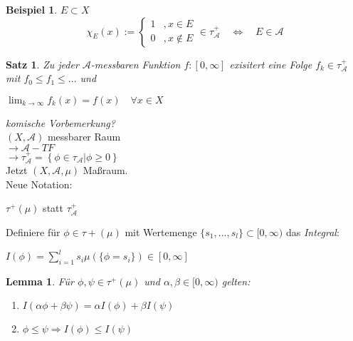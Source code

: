 \documentclass[11pt]{memoir}
\theoremstyle{changebreak}
\newtheorem{Beispiel}{Beispiel}[chapter]
\newtheorem{Lemma}{Lemma}[chapter]
\newtheorem{Satz}{Satz}[chapter]
\begin{document}
\begin{Beispiel}
$E \subset X$ \\
\begin{equation}
	\chi_E (x) :=
	\begin{cases}
		1 &, x \in E \\
		0 & , x \notin E
	\end{cases}
	\in \tau_\mathscr A^+ \quad \Leftrightarrow \quad E \in \mathscr A
\end{equation}
\end{Beispiel}

\begin{Satz}
Zu jeder $\mathscr A$-messbaren Funktion $f: [0, \infty]$ exisitert eine Folge $f_k \in \tau_\mathscr A^+$ mit $f_0 \leq f_1 \leq ...$ und
\begin{center}
	$\lim_{k \rightarrow \infty} f_k(x) = f(x) \quad \forall x\in X$
\end{center}
\end{Satz}



\par\bigskip

\emph{komische Vorbemerkung?}\\
$(X, \mathscr A)$ messbarer Raum \\
$\rightarrow \mathscr A-TF$ \\
$\rightarrow \tau_\mathscr A ^+ = \left\{\phi \in \tau_\mathscr A | \phi \geq 0\right\}$ \\
Jetzt $(X, \mathscr A, \mu)$ Maßraum. \\
Neue Notation: 
\begin{center}	
	\underline{$\tau^+ (\mu)$} statt $\tau_\mathscr A ^+$ 
\end{center}	
Definiere für $\phi \in \tau+(\mu)$ mit Wertemenge $\{s_1, ... , s_l\} \subset [0, \infty)$ das \emph{Integral}: 
\begin{center}
	$I(\phi) = \sum\limits_{i=1}^l s_i \mu(\{\phi = s_i\}) \in [0, \infty]$
\end{center}

\begin{Lemma}
Für $\phi, \psi \in \tau	^+(\mu)$ und $\alpha, \beta \in [0, \infty)$ gelten:
\begin{enumerate}
	\item $I(\alpha\phi + \beta\psi) = \alpha I(\phi) + \beta I(\psi)$
	\item $\phi \leq \psi \Rightarrow I(\phi) \leq I(\psi)$
\end{enumerate}
\end{Lemma}
\end{document}
